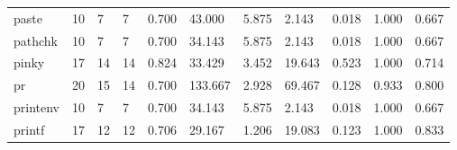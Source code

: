 \begin{longtable}{lp{1.2cm}p{1.2cm}p{1.2cm}p{1.2cm}p{1.2cm}p{1.2cm}p{1.2cm}p{1.2cm}p{1.2cm}p{1.2cm}}
paste     &                           10 &                  7 &                                 7 &                                      0.700 &                                 43.000 &                                        5.875 &                             2.143 &                                   0.018 &                              1.000 &                                              0.667 \\
pathchk   &                           10 &                  7 &                                 7 &                                      0.700 &                                 34.143 &                                        5.875 &                             2.143 &                                   0.018 &                              1.000 &                                              0.667 \\
pinky     &                           17 &                 14 &                                14 &                                      0.824 &                                 33.429 &                                        3.452 &                            19.643 &                                   0.523 &                              1.000 &                                              0.714 \\
pr        &                           20 &                 15 &                                14 &                                      0.700 &                                133.667 &                                        2.928 &                            69.467 &                                   0.128 &                              0.933 &                                              0.800 \\
printenv  &                           10 &                  7 &                                 7 &                                      0.700 &                                 34.143 &                                        5.875 &                             2.143 &                                   0.018 &                              1.000 &                                              0.667 \\
printf    &                           17 &                 12 &                                12 &                                      0.706 &                                 29.167 &                                        1.206 &                            19.083 &                                   0.123 &                              1.000 &                                              0.833 \\

\end{longtable}

